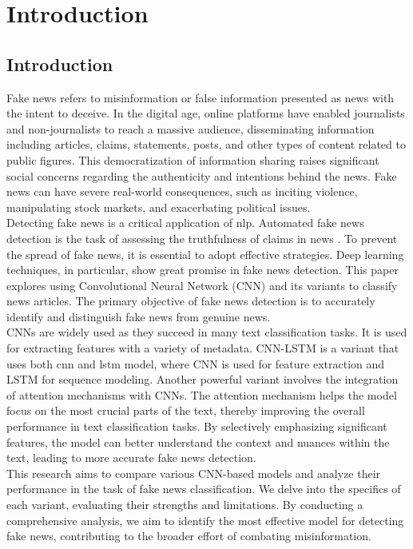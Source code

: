 \chapter{Introduction}

\section{Introduction}

Fake news refers to misinformation or false information presented as news with the intent to deceive. In the digital age, online platforms have enabled journalists and non-journalists to reach a massive audience, disseminating information including articles, claims, statements, posts, and other types of content related to public figures. This democratization of information sharing raises significant social concerns regarding the authenticity and intentions behind the news. Fake news can have severe real-world consequences, such as inciting violence, manipulating stock markets, and exacerbating political issues.\\

Detecting fake news is a critical application of \ac{nlp}. Automated fake news detection is the task of assessing the truthfulness of claims in news \cite{oshikawa2020survey}. To prevent the spread of fake news, it is essential to adopt effective strategies. Deep learning techniques, in particular, show great promise in fake news detection. This paper explores using Convolutional Neural Network (CNN) and its variants to classify news articles. The primary objective of fake news detection is to accurately identify and distinguish fake news from genuine news. \\

CNNs are widely used as they succeed in many text classification tasks. It is used for extracting features with a variety of metadata. CNN-LSTM is a variant that uses both \ac{cnn} and \ac{lstm} model, where CNN is used for feature extraction and LSTM for sequence modeling. Another powerful variant involves the integration of attention mechanisms with CNNs. The attention mechanism helps the model focus on the most crucial parts of the text, thereby improving the overall performance in text classification tasks. By selectively emphasizing significant features, the model can better understand the context and nuances within the text, leading to more accurate fake news detection. \\

This research aims to compare various CNN-based models and analyze their performance in the task of fake news classification. We delve into the specifics of each variant, evaluating their strengths and limitations. By conducting a comprehensive analysis, we aim to identify the most effective model for detecting fake news, contributing to the broader effort of combating misinformation.

